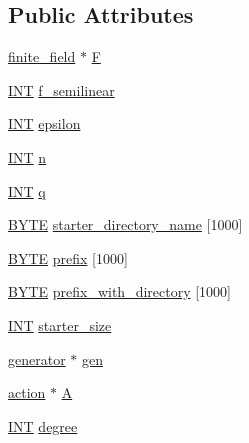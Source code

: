 \subsection*{Public Attributes}
\begin{DoxyCompactItemize}
\item 
\mbox{\hyperlink{classfinite__field}{finite\+\_\+field}} $\ast$ \mbox{\hyperlink{classblt__set_ae3a4dd741b4d034599339e933d2599a0}{F}}
\item 
\mbox{\hyperlink{galois_8h_a09fddde158a3a20bd2dcadb609de11dc}{I\+NT}} \mbox{\hyperlink{classblt__set_a983e07e42b8a2272d6b1df972f52622e}{f\+\_\+semilinear}}
\item 
\mbox{\hyperlink{galois_8h_a09fddde158a3a20bd2dcadb609de11dc}{I\+NT}} \mbox{\hyperlink{classblt__set_a0eeeaa45d2e49b935efa938704ef4e62}{epsilon}}
\item 
\mbox{\hyperlink{galois_8h_a09fddde158a3a20bd2dcadb609de11dc}{I\+NT}} \mbox{\hyperlink{classblt__set_acad6eb1665cabc8041a3bb09e8e4b755}{n}}
\item 
\mbox{\hyperlink{galois_8h_a09fddde158a3a20bd2dcadb609de11dc}{I\+NT}} \mbox{\hyperlink{classblt__set_a3f3d287695ca239c93035cee047e9be6}{q}}
\item 
\mbox{\hyperlink{galois_8h_ab6cc7b4aeb6ea31aba2b3fbfc83ff5e6}{B\+Y\+TE}} \mbox{\hyperlink{classblt__set_ae25dafff91276e73cfc8c84da2e3aa0b}{starter\+\_\+directory\+\_\+name}} \mbox{[}1000\mbox{]}
\item 
\mbox{\hyperlink{galois_8h_ab6cc7b4aeb6ea31aba2b3fbfc83ff5e6}{B\+Y\+TE}} \mbox{\hyperlink{classblt__set_a6bc356d27fe18af5e56279545e5f0524}{prefix}} \mbox{[}1000\mbox{]}
\item 
\mbox{\hyperlink{galois_8h_ab6cc7b4aeb6ea31aba2b3fbfc83ff5e6}{B\+Y\+TE}} \mbox{\hyperlink{classblt__set_a0d75417bedb442765e87652e6dae9a6c}{prefix\+\_\+with\+\_\+directory}} \mbox{[}1000\mbox{]}
\item 
\mbox{\hyperlink{galois_8h_a09fddde158a3a20bd2dcadb609de11dc}{I\+NT}} \mbox{\hyperlink{classblt__set_a5227d5487da07366a96c3a1c4eba1814}{starter\+\_\+size}}
\item 
\mbox{\hyperlink{classgenerator}{generator}} $\ast$ \mbox{\hyperlink{classblt__set_a1a9d340a742e1b8c4f69500634e4053a}{gen}}
\item 
\mbox{\hyperlink{classaction}{action}} $\ast$ \mbox{\hyperlink{classblt__set_a77dfc0a456c029e4900eacf77f8c445e}{A}}
\item 
\mbox{\hyperlink{galois_8h_a09fddde158a3a20bd2dcadb609de11dc}{I\+NT}} \mbox{\hyperlink{classblt__set_a3de62dd2090500e7fadf2e82334d0534}{degree}}

\end{DoxyCompactItemize}
